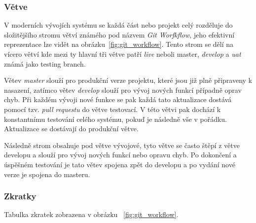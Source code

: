 \subsubsection*{Větve}
\label{subsubsec:implementation-collaboration-versioning-branches}
V moderních vývojích systému se každá část nebo projekt celý rozděluje do složitějšího stromu větví známého pod názvem \textit{Git Worfkflow}, jeho efektivní reprezentace lze vidět na obrázku~\ref{fig:git_workflow}. Tento strom se dělí na vícero větví kde mezi ty hlavní tři větve patří \textit{live} neboli master, \textit{develop} a \textit{uat} známá jako testing branch.

Větev \textit{master} slouží pro produkční verze projektu, které jsou již plně připraveny k nasazení, zatímco větev \textit{develop} slouží pro vývoj nových funkcí případně oprav chyb. Při každém vývoji nové funkce se pak každá tato aktualizace dostává pomocí tzv. \textit{pull requestu} do větve testovací. V této větvi pak dochází k konstantnímu testování celého systému, pokuď je následně vše v pořádku. Aktualizace se dostávají do produkční větve.

Následně strom obsahuje pod větve vývojové, tyto větve se často štěpí z větve developu a slouží pro vývoj nových funkcí nebo opravu chyb. Po dokončení a úspěšném testování je tato větev spojena zpět do developu a po vydání nové verze je spojena do masteru.

\subsubsection*{Zkratky}
Tabulka zkratek zobrazena v obrázku ~\ref{fig:git_workflow}.

